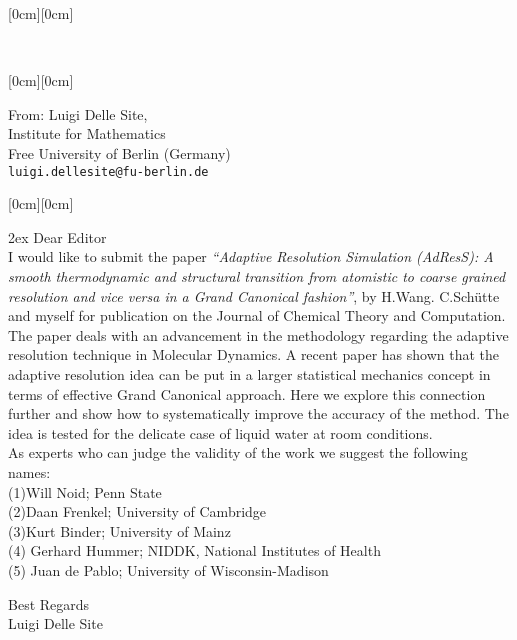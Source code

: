 \documentclass[12pt]{article}
\newcommand{\kopf}{\noindent
\raisebox{2.5cm}[0cm][0cm]
{
\parbox[c]{0.88\textwidth}
{
\begin{center}
\textsc{}\\
\textsc{}
\end{center}
}
}
}
\begin{document}
\kopf



\hfill\raisebox{1.5cm}[0cm][0cm] {\parbox[t]{0.34\textwidth}
{From: Luigi Delle Site,\\
Institute for Mathematics\\
Free University of Berlin (Germany)\\
{\tt\small luigi.dellesite@fu-berlin.de}\\
}}

\noindent\raisebox{1.8cm}[0cm][0cm]
{}

\vspace{3cm}



\vspace{2cm}

\parskip 2ex
Dear Editor\\
I would like to submit the paper {\it ``Adaptive Resolution Simulation (AdResS): A smooth thermodynamic and structural transition from atomistic to coarse grained resolution and vice versa in a Grand Canonical fashion''}, by H.Wang. C.Sch\"{u}tte and myself for publication on the Journal of Chemical Theory and Computation.
The paper deals with an advancement in the methodology regarding the adaptive resolution technique in Molecular Dynamics. A recent paper has shown that the adaptive resolution idea can be put in a larger statistical mechanics concept in terms of effective Grand Canonical approach. Here we explore this connection further and show how to systematically improve the accuracy of the method. The idea is tested for the delicate case of liquid water at room conditions.\\
As experts who can judge the validity of the work we suggest the following names:\\
(1)Will Noid; Penn State\\
(2)Daan Frenkel; University of Cambridge\\
(3)Kurt Binder; University of Mainz\\
(4) Gerhard Hummer; NIDDK, National Institutes of Health\\
(5) Juan de Pablo;  University of Wisconsin-Madison 



Best Regards\\
Luigi Delle Site\\
\end{document}
